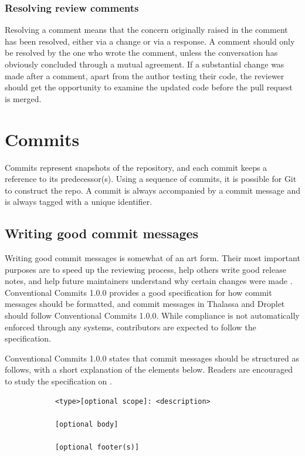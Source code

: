\documentclass[12pt,a4paper]{article}
\begin{document}
        \subsubsection{Resolving review comments}
            Resolving a comment means that the concern originally raised in the comment has been resolved, either via a change or via a response. A comment should only be resolved by the one who wrote the comment, unless the conversation has obviously concluded through a mutual agreement. If a substantial change was made after a comment, apart from the author testing their code, the reviewer should get the opportunity to examine the updated code before the pull request is merged.

\section{Commits}
\label{sec:commits}
    Commits represent snapshots of the repository, and each commit keeps a reference to its predecessor(s). Using a sequence of commits, it is possible for Git to construct the repo. A commit is always accompanied by a commit message and is always tagged with a unique identifier.

    \subsection{Writing good commit messages}
    \label{subsec:commit_messages}
        Writing good commit messages is somewhat of an art form. Their most important purposes are to speed up the reviewing process, help others write good release notes, and help future maintainers understand why certain changes were made \cite{hogberg_writing_2023}. Conventional Commits 1.0.0 \cite{noauthor_conventional_nodate} provides a good specification for how commit messages should be formatted, and commit messages in Thalassa and Droplet should follow Conventional Commits 1.0.0. While compliance is not automatically enforced through any systems, contributors are expected to follow the specification.

        Conventional Commits 1.0.0 states that commit messages should be structured as follows, with a short explanation of the elements below. Readers are encouraged to study the specification on \textcite{noauthor_conventional_nodate}.

        \begin{verbatim}
            <type>[optional scope]: <description>

            [optional body]

            [optional footer(s)]
        \end{verbatim}
\end{document}
